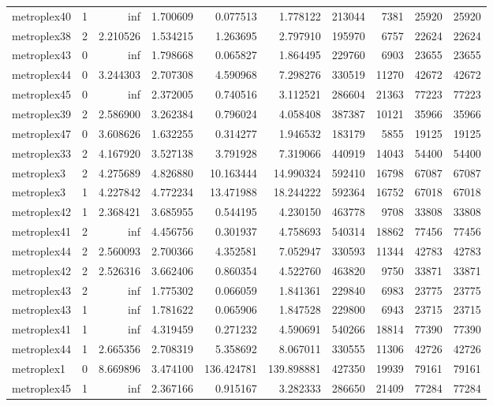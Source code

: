 \begin{longtable}{|l|r|r|r|r|r|r|r|r|r|}
metroplex40 & 1 & inf & 1.700609 & 0.077513 & 1.778122 & 213044 & 7381 & 25920 & 25920 \\
metroplex38 & 2 & 2.210526 & 1.534215 & 1.263695 & 2.797910 & 195970 & 6757 & 22624 & 22624 \\
metroplex43 & 0 & inf & 1.798668 & 0.065827 & 1.864495 & 229760 & 6903 & 23655 & 23655 \\
metroplex44 & 0 & 3.244303 & 2.707308 & 4.590968 & 7.298276 & 330519 & 11270 & 42672 & 42672 \\
metroplex45 & 0 & inf & 2.372005 & 0.740516 & 3.112521 & 286604 & 21363 & 77223 & 77223 \\
metroplex39 & 2 & 2.586900 & 3.262384 & 0.796024 & 4.058408 & 387387 & 10121 & 35966 & 35966 \\
metroplex47 & 0 & 3.608626 & 1.632255 & 0.314277 & 1.946532 & 183179 & 5855 & 19125 & 19125 \\
metroplex33 & 2 & 4.167920 & 3.527138 & 3.791928 & 7.319066 & 440919 & 14043 & 54400 & 54400 \\
metroplex3 & 2 & 4.275689 & 4.826880 & 10.163444 & 14.990324 & 592410 & 16798 & 67087 & 67087 \\
metroplex3 & 1 & 4.227842 & 4.772234 & 13.471988 & 18.244222 & 592364 & 16752 & 67018 & 67018 \\
metroplex42 & 1 & 2.368421 & 3.685955 & 0.544195 & 4.230150 & 463778 & 9708 & 33808 & 33808 \\
metroplex41 & 2 & inf & 4.456756 & 0.301937 & 4.758693 & 540314 & 18862 & 77456 & 77456 \\
metroplex44 & 2 & 2.560093 & 2.700366 & 4.352581 & 7.052947 & 330593 & 11344 & 42783 & 42783 \\
metroplex42 & 2 & 2.526316 & 3.662406 & 0.860354 & 4.522760 & 463820 & 9750 & 33871 & 33871 \\
metroplex43 & 2 & inf & 1.775302 & 0.066059 & 1.841361 & 229840 & 6983 & 23775 & 23775 \\
metroplex43 & 1 & inf & 1.781622 & 0.065906 & 1.847528 & 229800 & 6943 & 23715 & 23715 \\
metroplex41 & 1 & inf & 4.319459 & 0.271232 & 4.590691 & 540266 & 18814 & 77390 & 77390 \\
metroplex44 & 1 & 2.665356 & 2.708319 & 5.358692 & 8.067011 & 330555 & 11306 & 42726 & 42726 \\
metroplex1 & 0 & 8.669896 & 3.474100 & 136.424781 & 139.898881 & 427350 & 19939 & 79161 & 79161 \\
metroplex45 & 1 & inf & 2.367166 & 0.915167 & 3.282333 & 286650 & 21409 & 77284 & 77284 \\

\end{longtable}
